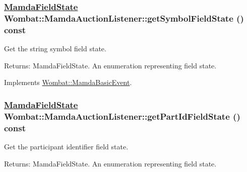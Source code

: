 \hypertarget{classWombat_1_1MamdaAuctionListener_d8ba0fa1c6fc027fe676cd72ec17007a}{
\subsubsection[getSymbolFieldState]{\setlength{\rightskip}{0pt plus 5cm}\hyperlink{namespaceWombat_93aac974f2ab713554fd12a1fa3b7d2a}{Mamda\-Field\-State} Wombat::Mamda\-Auction\-Listener::get\-Symbol\-Field\-State () const}}
\label{classWombat_1_1MamdaAuctionListener_d8ba0fa1c6fc027fe676cd72ec17007a}


Get the string symbol field state. 

\begin{Desc}
\item[Returns:]Mamda\-Field\-State. An enumeration representing field state. \end{Desc}


Implements \hyperlink{classWombat_1_1MamdaBasicEvent_ef95e19f4babb0e5ea8549d6cf29d13f}{Wombat::Mamda\-Basic\-Event}.\hypertarget{classWombat_1_1MamdaAuctionListener_9c0f690606ab4ec265fc97235e90c93d}{
\subsubsection[getPartIdFieldState]{\setlength{\rightskip}{0pt plus 5cm}\hyperlink{namespaceWombat_93aac974f2ab713554fd12a1fa3b7d2a}{Mamda\-Field\-State} Wombat::Mamda\-Auction\-Listener::get\-Part\-Id\-Field\-State () const}}
\label{classWombat_1_1MamdaAuctionListener_9c0f690606ab4ec265fc97235e90c93d}


Get the participant identifier field state. 

\begin{Desc}
\item[Returns:]Mamda\-Field\-State. An enumeration representing field state. \end{Desc}



